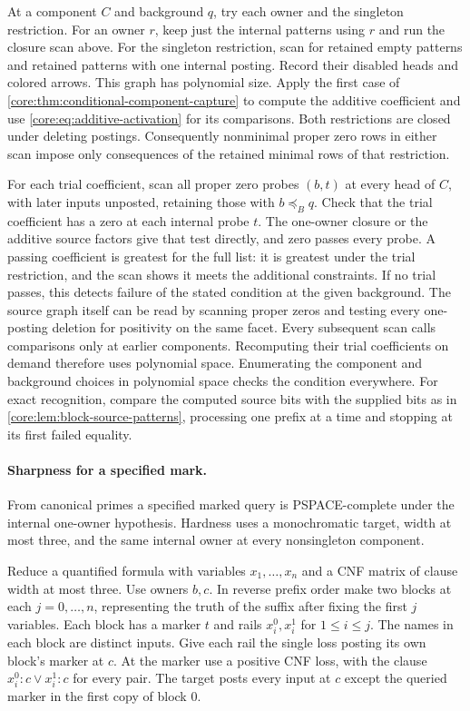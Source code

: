 At a component $C$ and background $q$, try each owner and
the singleton restriction. For an owner $r$, keep just the
internal patterns using $r$ and run the closure scan above.
For the singleton restriction, scan for retained empty
patterns and retained patterns with one internal posting.
Record their disabled heads and colored arrows. This graph
has polynomial size. Apply the first case of
\cref{core:thm:conditional-component-capture} to compute the
additive coefficient and use \eqref{core:eq:additive-activation}
for its comparisons. Both restrictions are closed under
deleting postings. Consequently nonminimal proper zero rows
in either scan impose only consequences of the retained
minimal rows of that restriction.

For each trial coefficient, scan all proper zero probes
$(b,t)$ at every head of $C$, with later inputs unposted,
retaining those with $b\preceq_B q$. Check that the trial
coefficient has a zero at each internal probe $t$. The
one-owner closure or the additive source factors give that
test directly, and zero passes every probe. A passing
coefficient is greatest for the full list: it is greatest
under the trial restriction, and the scan shows it meets
the additional constraints. If no trial passes, this detects
failure of the stated condition at the given background.
The source graph itself can be read by scanning proper
zeros and testing every one-posting deletion for positivity
on the same facet. Every subsequent scan calls comparisons
only at earlier components.
Recomputing their trial coefficients on demand therefore
uses polynomial space. Enumerating the component and
background choices in polynomial space checks the condition
everywhere. For exact recognition, compare the computed
source bits with the supplied bits as in
\cref{core:lem:block-source-patterns}, processing one prefix
at a time and stopping at its first failed equality.

\paragraph{Sharpness for a specified mark.}
From canonical primes a specified marked query is
PSPACE-complete under the internal one-owner hypothesis.
Hardness uses a monochromatic target, width at most three,
and the same internal owner at every nonsingleton component.

Reduce a quantified formula with variables $x_1,\ldots,x_n$
and a CNF matrix of clause width at most three. Use owners
$b,c$. In reverse prefix order make two blocks at each
$j=0,\ldots,n$, representing the truth of the suffix after
fixing the first $j$ variables. Each block has a marker $t$
and rails $x_i^0,x_i^1$ for $1\le i\le j$. The names in each
block are distinct inputs. Give each rail the single loss
posting its own block's marker at $c$. At the marker use a
positive CNF loss, with the clause $x_i^0:c\lor x_i^1:c$ for
every pair. The target posts every input at $c$ except the
queried marker in the first copy of block $0$.

